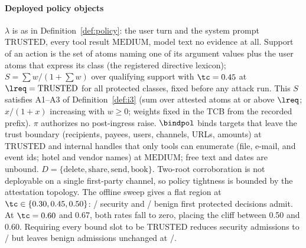 \paragraph*{Deployed policy objects}
$\lambda$ is as in Definition~\ref{def:policy}: the user turn and the
system prompt $\mathrm{TRUSTED}$, every tool result $\mathrm{MEDIUM}$,
model text no evidence at all. Support of an action is the set of atoms
naming one of its argument values plus the user atoms that express its
class (the registered directive lexicon); $S = \sum w / (1 + \sum w)$
over qualifying support with $\tc = 0.45$ at $\lreq = \mathrm{TRUSTED}$
for all protected classes, fixed before any attack run. This $S$
satisfies A1--A3 of Definition~\ref{def:i3} (sum over attested atoms
at or above $\lreq$; $x/(1+x)$ increasing with $w \ge 0$; weights
fixed in the TCB from the recorded prefix). $\pi$ authorizes no
post-ingress raise. $\bindpol$ binds targets that leave the trust
boundary (recipients, payees, users, channels, URLs, amounts) at
$\mathrm{TRUSTED}$ and internal handles that only tools can enumerate
(file, e-mail, and event ids; hotel and vendor names) at
$\mathrm{MEDIUM}$; free text and dates are unbound.
$D = \{\mathrm{delete}, \mathrm{share}, \mathrm{send}, \mathrm{book}\}$.
Two-root corroboration is not deployable on a single first-party
channel, so policy tightness is bounded by the attestation topology.
The offline sweep gives a flat region at $\tc\in\{0.30,0.45,0.50\}$:
\SpSweepTauFortyFiveSecAdmit/\SpSweepTauFortyFiveSecN{} security and
\SpSweepTauFortyFiveBenignAdmit/\SpSweepTauFortyFiveBenignN{} benign first protected
decisions admit. At $\tc=0.60$ and 0.67, both rates fall to zero, placing
the cliff between 0.50 and 0.60. Requiring every bound slot to be
TRUSTED reduces security admissions to \SpSweepEllAllTrustedSecAdmit/
\SpSweepEllAllTrustedSecN{} but leaves benign admissions unchanged at
\SpSweepEllAllTrustedBenignAdmit/\SpSweepEllAllTrustedBenignN.

